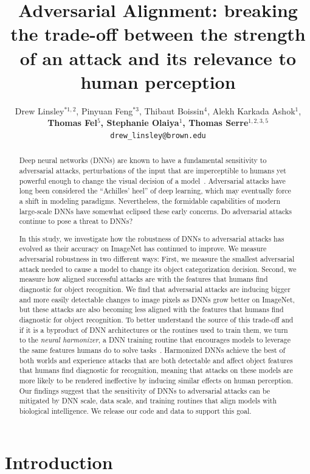 \documentclass{article}
\title{Adversarial Alignment: breaking the trade-off between the strength of an attack and its relevance to human perception}
\author{%
  Drew Linsley$^{*1,2}$, Pinyuan Feng$^{*3}$, Thibaut Boissin$^{4}$, Alekh Karkada Ashok$^{1}$, \\ \textbf{Thomas Fel$^{5}$, Stephanie Olaiya$^{1}$, Thomas Serre$^{1,2,3,5}$} \\
  \texttt{drew\_linsley@brown.edu}
}
\theoremstyle{plain}
\theoremstyle{definition}
\theoremstyle{remark}
\begin{document}
\maketitle

\begin{abstract}
Deep neural networks (DNNs) are known to have a fundamental sensitivity to adversarial attacks, perturbations of the input that are imperceptible to humans yet powerful enough to change the visual decision of a model~\cite{Szegedy2014-qj}. Adversarial attacks have long been considered the ``Achilles' heel'' of deep learning, which may eventually force a shift in modeling paradigms. Nevertheless, the formidable capabilities of modern large-scale DNNs have somewhat eclipsed these early concerns. Do adversarial attacks continue to pose a threat to DNNs?

In this study, we investigate how the robustness of DNNs to adversarial attacks has evolved as their accuracy on ImageNet has continued to improve. We measure adversarial robustness in two different ways: First, we measure the smallest adversarial attack needed to cause a model to change its object categorization decision. Second, we measure how aligned successful attacks are with the features that humans find diagnostic for object recognition. We find that adversarial attacks are inducing bigger and more easily detectable changes to image pixels as DNNs grow better on ImageNet, but these attacks are also becoming less aligned with the features that humans find diagnostic for object recognition. To better understand the source of this trade-off and if it is a byproduct of DNN architectures or the routines used to train them, we turn to the \emph{neural harmonizer}, a DNN training routine that encourages models to leverage the same features humans do to solve tasks~\cite{Fel2022-dt}. Harmonized DNNs achieve the best of both worlds and experience attacks that are both detectable and affect object features that humans find diagnostic for recognition, meaning that attacks on these models are more likely to be rendered ineffective by inducing similar effects on human perception. Our findings suggest that the sensitivity of DNNs to adversarial attacks can be mitigated by DNN scale, data scale, and training routines that align models with biological intelligence. We release our code and data to support this goal.
\end{abstract}

\section{Introduction}
\end{document}
